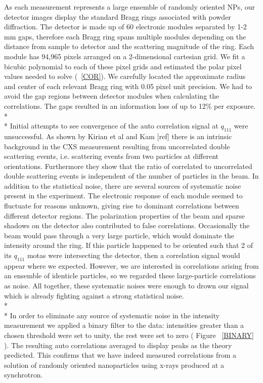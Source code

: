 \documentclass[a4paper,12pt]{article}
\begin{document}
As each measurement represents a large ensemble of randomly oriented NPs, our detector images display the standard Bragg rings associated with powder diffraction. The detector is made up of 60 electronic modules separated by 1-2 mm gaps, therefore each Bragg ring spans multiple modules depending on the distance from sample to detector and the scattering magnitude of the ring. Each module has 94,965 pixels arranged on a 2-dimensional cartesian grid. We fit a bicubic polynomial to each of these pixel grids and estimated the polar pixel values needed to solve (~\ref{COR}). We carefully located the approximate radius and center of each relevant  Bragg ring with 0.05 pixel unit precision. We had to avoid the gap regions between detector modules when calculating the correlations. The gaps resulted in an information loss of up to 12\% per exposure.
\\*
\\*
\noindent Initial attempts to see convergence of the auto correlation signal at $q_{111}$ were unsuccessful. As shown by Kirian et al and Kam [ref] there is an intrinsic background in the CXS measurement resulting from uncorrelated double scattering events, i.e. scattering events from two particles at different orientations. Furthermore they show that the ratio of correlated to uncorrelated double scattering events is independent of the number of particles in the beam. In addition to the statistical noise, there are several sources of systematic noise present in the experiment. The electronic response of each module seemed to fluctuate for reasons unknown, giving rise to dominant correlations between different detector regions. The polarization properties of the beam and sparse shadows on the detector also contributed to false correlations. Occasionally the beam would pass through a very large particle, which would dominate the intensity around the ring. If this particle happened to be oriented such that 2 of its $q_{111}$ motas were intersecting the detector, then a correlation signal would appear where we expected. However, we are interested in correlations arising from an ensemble of identicle particles, so we regarded these large-particle correlations as noise. All together, these systematic noises were enough to drown our signal which is already fighting against a strong statistical noise.
\\*
\\*
\noindent In order to eliminate any source of systematic noise in the intensity measurement we applied a binary filter to the data: intensities greater than a chosen threshold were set to unity, the rest were set to zero ( Figure ~\ref{BINARY} ). The resulting auto correlations averaged to display peaks as the theory predicted. This confirms that we have indeed measured correlations from a solution of randomly oriented nanoparticles using x-rays produced at a synchrotron.    
\end{document}
